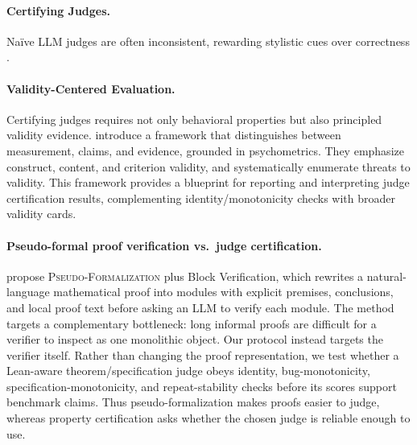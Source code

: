 \documentclass{article}
\begin{document}
\paragraph{Certifying Judges.}
Naïve LLM judges are often inconsistent, rewarding stylistic cues over correctness \citep{Kocmi2024HumanVsLLM,Li2024TrustLLMJudgments}.

\paragraph{Validity-Centered Evaluation.}
Certifying judges requires not only behavioral properties but also principled validity evidence. \citet{salaudeen2025measurement} introduce a framework that distinguishes between measurement, claims, and evidence, grounded in psychometrics. They emphasize construct, content, and criterion validity, and systematically enumerate threats to validity. This framework provides a blueprint for reporting and interpreting judge certification results, complementing identity/monotonicity checks with broader validity cards.

\paragraph{Pseudo-formal proof verification vs.\ judge certification.}
\citet{barkallah2026pseudoformalization} propose \textsc{Pseudo-Formalization} plus Block Verification, which rewrites a natural-language mathematical proof into modules with explicit premises, conclusions, and local proof text before asking an LLM to verify each module.
The method targets a complementary bottleneck: long informal proofs are difficult for a verifier to inspect as one monolithic object.
Our protocol instead targets the verifier itself.
Rather than changing the proof representation, we test whether a Lean-aware theorem/specification judge obeys identity, bug-monotonicity, specification-monotonicity, and repeat-stability checks before its scores support benchmark claims.
Thus pseudo-formalization makes proofs easier to judge, whereas property certification asks whether the chosen judge is reliable enough to use.
\end{document}
